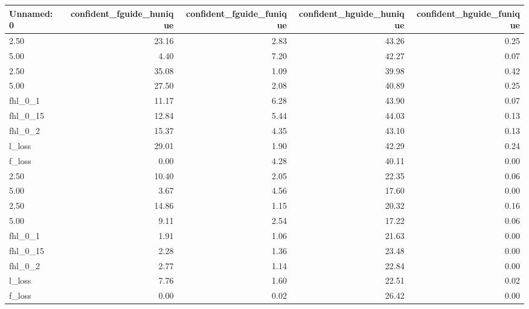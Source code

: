 \begin{tabular}{lrrrr}
\toprule
Unnamed: 0 & confident_fguide_hunique & confident_fguide_funique & confident_hguide_hunique & confident_hguide_funique \\
\midrule
2.50 & 23.16 & 2.83 & 43.26 & 0.25 \\
5.00 & 4.40 & 7.20 & 42.27 & 0.07 \\
2.50 & 35.08 & 1.09 & 39.98 & 0.42 \\
5.00 & 27.50 & 2.08 & 40.89 & 0.25 \\
fhl_0_1 & 11.17 & 6.28 & 43.90 & 0.07 \\
fhl_0_15 & 12.84 & 5.44 & 44.03 & 0.13 \\
fhl_0_2 & 15.37 & 4.35 & 43.10 & 0.13 \\
l_loss & 29.01 & 1.90 & 42.29 & 0.24 \\
f_loss & 0.00 & 4.28 & 40.11 & 0.00 \\
2.50 & 10.40 & 2.05 & 22.35 & 0.06 \\
5.00 & 3.67 & 4.56 & 17.60 & 0.00 \\
2.50 & 14.86 & 1.15 & 20.32 & 0.16 \\
5.00 & 9.11 & 2.54 & 17.22 & 0.06 \\
fhl_0_1 & 1.91 & 1.06 & 21.63 & 0.00 \\
fhl_0_15 & 2.28 & 1.36 & 23.48 & 0.00 \\
fhl_0_2 & 2.77 & 1.14 & 22.84 & 0.00 \\
l_loss & 7.76 & 1.60 & 22.51 & 0.02 \\
f_loss & 0.00 & 0.02 & 26.42 & 0.00 \\
\bottomrule
\end{tabular}
